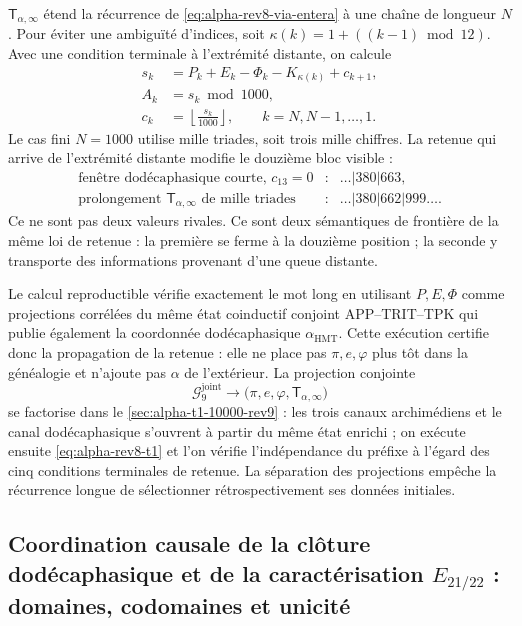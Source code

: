 \(\mathsf T_{\alpha,\infty}\) étend la récurrence de
\eqref{eq:alpha-rev8-via-entera} à une chaîne
de longueur \(N\). Pour éviter une ambiguïté d’indices, soit
\(\kappa(k)=1+((k-1)\bmod12)\). Avec une condition terminale à l’extrémité
distante, on calcule
\begin{equation}
\begin{aligned}
 s_k&=P_k+E_k-\Phi_k-K_{\kappa(k)}+c_{k+1},\\
 A_k&=s_k\bmod1000,\\
 c_k&=\left\lfloor\frac{s_k}{1000}\right\rfloor,
 \qquad k=N,N-1,\ldots,1.
\end{aligned}
\label{eq:alpha-rev8-t1}
\end{equation}
Le cas fini \(N=1000\) utilise mille triades, soit trois mille chiffres. La
retenue qui arrive de l’extrémité distante modifie le douzième
bloc visible :
\[
\begin{array}{rcl}
\text{fenêtre dodécaphasique courte, }c_{13}=0
 &:& \ldots|380|663,\\
\text{prolongement }\mathsf T_{\alpha,\infty}\text{ de mille triades}
 &:& \ldots|380|662|999\ldots.
\end{array}
\]
Ce ne sont pas deux valeurs rivales. Ce sont deux sémantiques de frontière de la même loi de
retenue : la première se ferme à la douzième position ; la seconde y transporte
des informations provenant d’une queue distante.

Le calcul reproductible vérifie exactement le mot long en utilisant
\(P,E,\Phi\) comme projections corrélées du même état coinductif
conjoint APP--TRIT--TPK qui publie également la coordonnée dodécaphasique
\(\alpha_{\mathrm{HMT}}\). Cette exécution certifie donc la propagation
de la retenue : elle ne place pas \(\pi,e,\varphi\) plus tôt dans la généalogie et n’ajoute pas
\(\alpha\) de l’extérieur. La projection conjointe
\[
 \mathcal G_9^{\mathrm{joint}}\longrightarrow
 \bigl(\pi,e,\varphi,\mathsf T_{\alpha,\infty}\bigr)
\]
se factorise dans le \cref{sec:alpha-t1-10000-rev9} : les trois canaux
archimédiens et le canal dodécaphasique s’ouvrent à partir du même état
enrichi ; on exécute ensuite \eqref{eq:alpha-rev8-t1} et l’on vérifie
l’indépendance du préfixe à l’égard des cinq conditions terminales de
retenue. La séparation des projections empêche la récurrence longue de
sélectionner rétrospectivement ses données initiales.

\subsection{Coordination causale de la clôture dodécaphasique et de la caractérisation \texorpdfstring{\(E_{21/22}\)}{E21/22} : domaines, codomaines et unicité}


